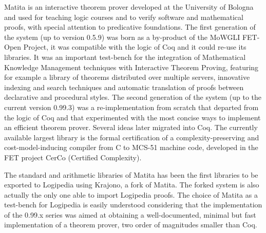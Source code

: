 

Matita is an interactive theorem prover developed at the University of Bologna and used for teaching logic courses and to verify software and mathematical proofs, with special attention to predicative foundations. The first generation of the system (up to version 0.5.9) was born as a by-product of the MoWGLI FET-Open Project, it was compatible with the logic of Coq and it could re-use its libraries. It was an important test-bench for the integration of Mathematical Knowledge Management techniques with Interactive Theorem Proving, featuring for example a library of theorems distributed over multiple servers, innovative indexing and search techniques and automatic translation of proofs between declarative and procedural styles. The second generation of the system (up to the current version 0.99.3) was a re-implementation from scratch that departed from the logic of Coq and that experimented with the most concise ways to implement an efficient theorem prover. Several ideas later migrated into Coq. The currently available largest library is the formal certification of a complexity-preserving and cost-model-inducing compiler from C to MCS-51 machine code, developed in the FET project CerCo (Certified Complexity).

The standard and arithmetic libraries of Matita has been the first libraries to be exported to Logipedia using Krajono, a fork of Matita. The forked system is also actually the only one able to import Logipedia proofs. The choice of Matita as a test-bench for Logipedia is easily understood considering that the implementation of the 0.99.x series was aimed at obtaining a well-documented, minimal but fast implementation of a theorem prover, two order of magnitudes smaller than Coq.

